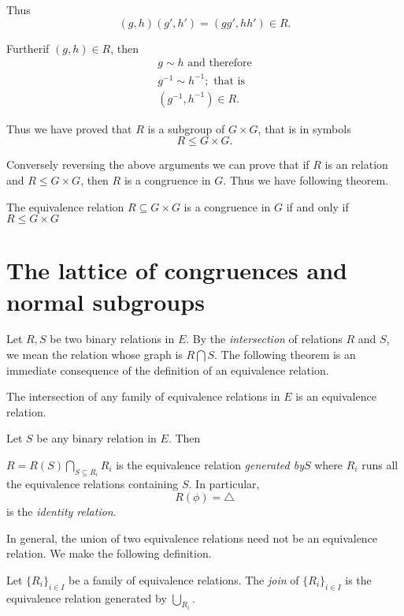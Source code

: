 Thus 
$$
(g,h) (g', h') = (gg', hh') \in  R.
$$

Further\pageoriginale if $(g,h) \in  R$, then
\begin{gather*}
  g \sim h \text{ and therefore}\\
  g^{-1} \sim h^{-1} ; \text { that is}\\
  (g^{-1}, h^{-1}) \in  R.
\end{gather*}

Thus we have proved that $R$ is a subgroup of $G \times G$, that is in
symbols 
$$
R \le G \times G.
$$

Conversely reversing the above arguments we can prove that if $R$ is
an relation and $R \le G \times G$, then $R$ is a congruence in
$G$. Thus we have following theorem.  

\begin{theorem}\label{chap3:sec6:thm12} %
  The equivalence relation $R \subseteq G \times G$ is a congruence in
  $G$ if and only if $ R \le G \times G$ 
\end{theorem}

\section{The lattice of congruences and normal subgroups}\label{chap3:sec7} %

Let $R,S$ be two binary relations in $E$. By the \textit{intersection}
of relations $R$ and $S$, we mean the relation whose graph is $R
\bigcap S$. The following theorem is an immediate consequence of the
definition of an equivalence relation. 

\begin{theorem}\label{chap3:sec7:thm13} %
  The intersection of any family of equivalence relations in $E$ is an
  equivalence relation.  
\end{theorem}

Let $S$ be any binary relation in $E$. Then

$R = R (S) \bigcap\limits_{S \subseteq R_i} R_i$ is the equivalence relation
\textit{ generated by}\pageoriginale $S$ where $R_i$ runs all the equivalence
relations containing $S$. In particular, 
$$
R (\phi) = \triangle
$$
is the \textit {identity relation}.

In general, the union of two equivalence relations need not be an
equivalence relation. We make the following definition. 

\begin{defi*}
  Let $\{R_i\}_{i \in  I}$ be a family of equivalence
  relations. The \textit {join} of $\{R_i\}_{i \in  I}$ is the
  equivalence relation generated by $\bigcup _{R_i}$. 
\end{defi*} 

